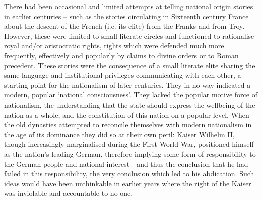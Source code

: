 There had been occasional and limited attempts at telling national origin stories in earlier centuries – such as the stories circulating in Sixteenth century France about the descent of the French (i.e.
its elite) from the Franks and from Troy.
However, these were limited to small literate circles and functioned to rationalise royal and/or aristocratic rights, rights which were defended much more frequently, effectively and popularly by claims to divine orders or to Roman precedent.
These stories were the consequence of a small literate elite sharing the same language and institutional privileges communicating with each other, a starting point for the nationalism of later centuries.
They in no way indicated a modern, popular ‘national consciousness’.
They lacked the popular motive force of nationalism, the understanding that the state should express the wellbeing of the nation as a whole, and the constitution of this nation on a popular level.
When the old dynasties attempted to reconcile themselves with modern nationalism in the age of its dominance they did so at their own peril: Kaiser Wilhelm II, though increasingly marginalised during the First World War, positioned himself as the nation’s leading German, therefore implying some form of responsibility to the German people and national interest - and thus the conclusion that he had failed in this responsibility, the very conclusion which led to his abdication.
Such ideas would have been unthinkable in earlier years where the right of the Kaiser was inviolable and accountable to no-one.

